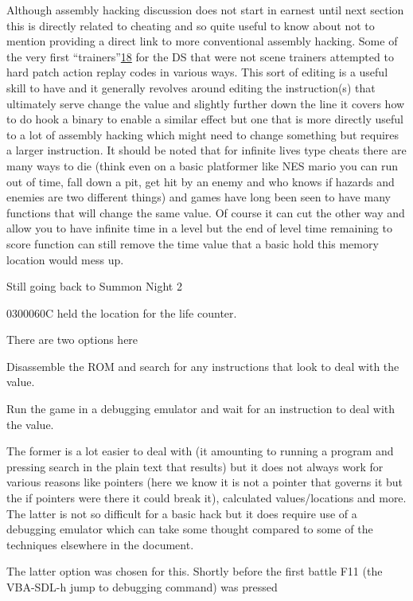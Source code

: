 \documentclass[
]{book}
\begin{document}
Although assembly hacking discussion does not start in earnest until next section this is directly related to cheating and so quite useful to know about not to mention providing a direct link to more conventional assembly hacking. Some of the very first ``trainers''\href{romhacking202019.html\#fn18x0}{18} for the DS that were not scene trainers attempted to hard patch action replay codes in various ways. This sort of editing is a useful skill to have and it generally revolves around editing the instruction(s) that ultimately serve change the value and slightly further down the line it covers how to do hook a binary to enable a similar effect but one that is more directly useful to a lot of assembly hacking which might need to change something but requires a larger instruction. It should be noted that for infinite lives type cheats there are many ways to die (think even on a basic platformer like NES mario you can run out of time, fall down a pit, get hit by an enemy and who knows if hazards and enemies are two different things) and games have long been seen to have many functions that will change the same value. Of course it can cut the other way and allow you to have infinite time in a level but the end of level time remaining to score function can still remove the time value that a basic hold this memory location would mess up.

Still going back to Summon Night 2

0300060C held the location for the life counter.

There are two options here

Disassemble the ROM and search for any instructions that look to deal with the value.

Run the game in a debugging emulator and wait for an instruction to deal with the value.

The former is a lot easier to deal with (it amounting to running a program and pressing search in the plain text that results) but it does not always work for various reasons like pointers (here we know it is not a pointer that governs it but the if pointers were there it could break it), calculated values/locations and more. The latter is not so difficult for a basic hack but it does require use of a debugging emulator which can take some thought compared to some of the techniques elsewhere in the document.

The latter option was chosen for this. Shortly before the first battle F11 (the VBA-SDL-h jump to debugging command) was pressed
\end{document}
